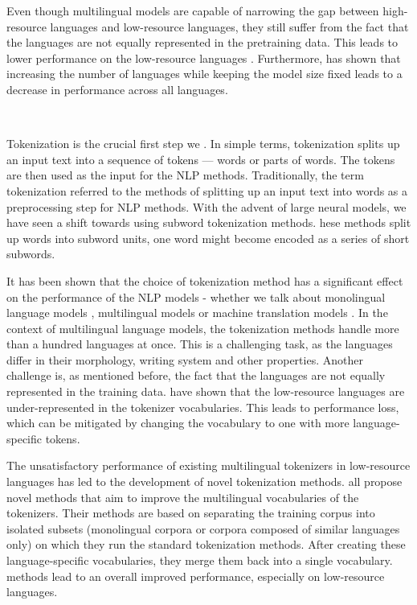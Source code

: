 Even though multilingual models are capable of narrowing the gap between high-resource languages and low-resource languages, they still suffer from the fact that the languages are not equally represented in the pretraining data. This leads to lower performance on the low-resource languages \cite{conneau_unsupervised_2020}. Furthermore, \citet{conneau_unsupervised_2020} has shown that increasing the number of languages while keeping the model size fixed leads to a decrease in performance across all languages. \cite{conneau_unsupervised_2020}

~

Tokenization is the crucial first step we .
 In simple terms, tokenization splits up an input text into a sequence of tokens --- words or parts of words. The tokens are then used as the input for the NLP methods. Traditionally, the term tokenization referred to the methods of splitting up an input text into words as a preprocessing step for NLP methods. With the advent of large neural models, we have seen a shift towards using subword tokenization methods.
 hese methods split up words into subword units, one word might become encoded as a series of short subwords.

It has been shown that the choice of tokenization method has a significant effect on the performance of the NLP models - whether we talk about monolingual language models \cite{bostrom_byte_2020}, multilingual models \cite{rust_how_2021} or machine translation models \cite{kudo_sentencepiece_2018,gowda_finding_2020}. In the context of multilingual language models, the tokenization methods handle more than a hundred languages at once. This is a challenging task, as the languages differ in their morphology, writing system and other properties. Another challenge is, as mentioned before, the fact that the languages are not equally represented in the training data. \citet{rust_how_2021} have shown that the low-resource languages are under-represented in the tokenizer vocabularies. This leads to performance loss, which can be mitigated by changing the vocabulary to one with more language-specific tokens. \cite{rust_how_2021}

The unsatisfactory performance of existing multilingual tokenizers in low-resource languages has led to the development of novel tokenization methods. \citet{chung_improving_2020,zheng_allocating_2021,liang_xlm-v_2023} all propose novel methods that aim to improve the multilingual vocabularies of the tokenizers. Their methods are based on separating the training corpus into isolated subsets (monolingual corpora or corpora composed of similar languages only) on which they run the standard tokenization methods. After creating these language-specific vocabularies, they merge them back into a single vocabulary.  methods lead to an overall improved performance, especially on low-resource languages.

